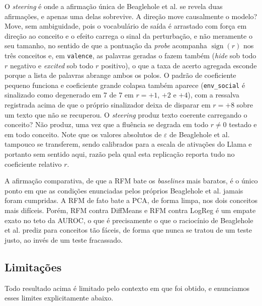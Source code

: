 O \textit{steering} é onde a afirmação única de Beaglehole et al. se revela duas afirmações, e
apenas uma delas sobrevive. A direção move causalmente o modelo? Move, sem ambiguidade,
pois o vocabulário de saída é arrastado com força em direção ao conceito e o efeito carrega
o sinal da perturbação, e não meramente o seu tamanho, no sentido de que a pontuação da
\textit{probe} acompanha $\operatorname{sign}(r)$ nos três conceitos e, em \verb|valence|,
as palavras geradas o fazem também (\emph{hide} sob todo $r$ negativo e \emph{excited} sob
todo $r$ positivo), o que a taxa de acerto agregada esconde porque a lista de palavras
abrange ambos os polos. O padrão de coeficiente pequeno funciona e coeficiente grande
colapsa também aparece (\verb|env_social| é sinalizado como degenerado em 7 de 7 em
$r = +1$, $+2$ e $+4$), com a ressalva registrada acima de que o próprio sinalizador deixa
de disparar em $r = +8$ sobre um texto que não se recuperou. O \textit{steering} produz texto
coerente carregando o conceito? Não produz, uma vez que a fluência se degrada em todo
$r \neq 0$ testado e em todo conceito. Note que os valores absolutos de $\varepsilon$ de
Beaglehole et al. tampouco se transferem, sendo calibrados para a escala de ativações do
Llama e portanto sem sentido aqui, razão pela qual esta replicação reporta tudo no
coeficiente relativo $r$.

A afirmação comparativa, de que a RFM bate os \textit{baselines} mais baratos, é o único
ponto em que as condições enunciadas pelos próprios Beaglehole et al. jamais foram
cumpridas. A RFM de fato bate a PCA, de forma limpa, nos dois conceitos mais difíceis.
Porém, RFM contra DiffMeans e RFM contra LogReg é um empate exato no
teto da AUROC, o que é precisamente o que o raciocínio de Beaglehole et al. prediz para
conceitos tão fáceis, de forma que nunca se tratou de um teste justo, ao invés de um teste
fracassado.

\subsection{Limitações}

Todo resultado acima é limitado pelo contexto em que foi obtido, e enunciamos esses limites
explicitamente abaixo.

